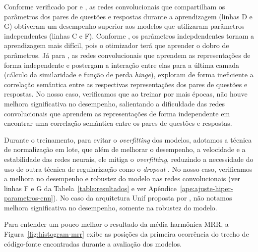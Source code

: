 Conforme verificado por \cite{tan-lstm-qa} e \cite{feng-2015}, as redes convolucionais que compartilham os parâmetros dos pares de questões e respostas durante a aprendizagem (linhas D e G) obtiveram um desempenho superior aos modelos que utilizaram parâmetros independentes (linhas C e F). Conforme \cite{tan-lstm-qa}, os parâmetros indepdendentes tornam a aprendizagem mais difícil, pois o otimizador terá que aprender o dobro de parâmetros. Já para \cite{wen-joint-modeling-question-answer-2019}, as redes convolucionais que aprendem as representações de forma independente e postergam a interação entre elas para a última camada (cálculo da similaridade e função de perda \textit{hinge}), exploram de forma ineficiente a correlação semântica entre as respectivas representações dos pares de questões e respostas. No nosso caso, verificamos que ao treinar por mais épocas, não houve melhora significativa no desempenho, salientando a dificuldade das redes convolucionais que aprendem as representações de forma independente em encontrar uma correlação semântica entre os pares de questões e respostas.

Durante o treinamento, para evitar o \textit{overfitting} dos modelos, adotamos a técnica de normalização em lote, que além de melhorar o desempenho, a velocidade e a estabilidade das redes neurais, ele mitiga o \textit{overfitting}, reduzindo a necessidade do uso de outra técnica de regularização como o \textit{dropout} \citep{sergey-batch-normalization-2015}. No nosso caso, verificamos a melhora no desempenho e robustez do modelo nas redes convolucionais (ver linhas F e G da Tabela~\ref{table:resultados} e ver Apêndice~\ref{ape:ajuste-hiper-parametros-cnn}). No caso da arquitetura Unif proposta por \cite{cambronero-deep-learning-code-search:2019}, não notamos melhora significativa no desempenho, somente na robustez do modelo.


Para entender um pouco melhor o resultado da média harmônica MRR, a Figura~\ref{fig:histogram-mrr} exibe as posições da primeira ocorrência do trecho de código-fonte encontradas durante a avaliação dos modelos.

